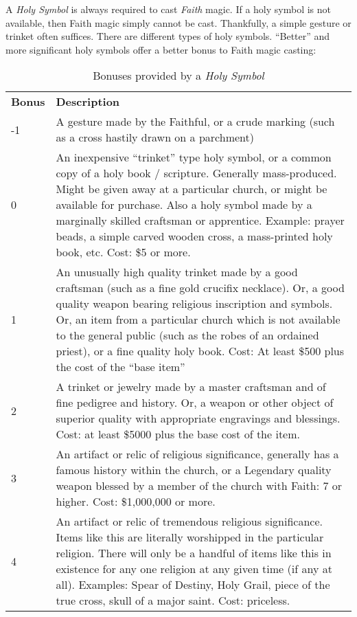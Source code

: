 A \emph{Holy Symbol} is always required to cast \emph{Faith} magic.
If a holy symbol is not available, then Faith magic simply cannot be
cast.  Thankfully, a simple gesture or trinket often suffices.  There
are different types of holy symbols.  ``Better'' and more significant
holy symbols offer a better bonus to Faith magic casting:

\begin{table}[htb]
\begin{center}
\begin{tabular}{p{2em}p{4.5in}}
  \textbf{Bonus} & \textbf{Description} \\
  -1 & A gesture made by the Faithful, or a crude marking (such as a cross hastily drawn on a parchment) \\
  0 & An inexpensive ``trinket'' type holy symbol, or a common copy of a holy book / scripture.  Generally mass-produced.  Might be given away at a particular church, or might be available for purchase.  Also a holy symbol made by a marginally skilled craftsman or apprentice.  Example: prayer beads, a simple carved wooden cross, a mass-printed holy book, etc.  Cost:  \$5 or more. \\
  1 & An unusually high quality trinket made by a good craftsman (such as a fine gold crucifix necklace).  Or, a good quality weapon bearing religious inscription and symbols. Or, an item from a particular church which is not available to the general public (such as the robes of an ordained priest), or a fine quality holy book.  Cost:  At least \$500 plus the cost of the ``base item'' \\
  2 & A trinket or jewelry made by a master craftsman and of fine pedigree and history.  Or, a weapon or other object of superior quality with appropriate engravings and blessings.  Cost: at least \$5000 plus the base cost of the item. \\
  3 & An artifact or relic of religious significance, generally has a famous history within the church, or a Legendary quality weapon blessed by a member of the church with Faith: 7 or higher.  Cost: \$1,000,000 or more. \\
  4 & An artifact or relic of tremendous religious significance.  Items like this are literally worshipped in the particular religion.  There will only be a handful of items like this in existence for any one religion at any given time (if any at all).  Examples:  Spear of Destiny, Holy Grail, piece of the true cross, skull of a major saint. Cost: priceless. \\
\end{tabular}
\caption{Bonuses provided by a \emph{Holy Symbol}}
\end{center}
\end{table}

